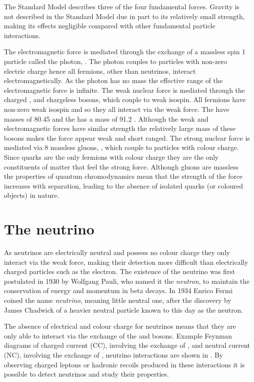 The Standard Model describes three of the four fundamental forces. Gravity is not described in the Standard Model due in part to its relatively small strength, making its effects negligible compared with other fundamental particle interactions.

The electromagnetic force is mediated through the exchange of a massless spin 1 particle called the photon, \Pphoton. The photon couples to particles with non-zero electric charge hence all fermions, other than neutrinos, interact electromagnetically. As the photon has no mass the effective range of the electromagnetic force is infinite. The weak nuclear force is mediated through the charged \PWplus, \PWminus and chargeless \PZzero bosons, which couple to weak isospin. All fermions have non-zero weak isospin and so they all interact via the weak force. The \PWpm have masses of 80.45 \GeV and the \PZzero has a mass of 91.2 \GeV. Although the weak and electromagnetic forces have similar strength the relatively large mass of these bosons makes the force appear weak and short ranged. The strong nuclear force is mediated via 8 massless gluons, \Pgluon, which couple to particles with colour charge. Since quarks are the only fermions with colour charge they are the only constituents of matter that feel the strong force. Although gluons are massless the properties of quantum chromodynamics mean that the strength of the force increases with separation, leading to the absence of isolated quarks (or coloured objects) in nature.



\section{The neutrino}
\label{section:particle-physics:neutrino}

As neutrinos are electrically neutral and possess no colour charge they only interact via the weak force, making their detection more difficult than electrically charged particles such as the electron. The existence of the neutrino was first postulated in 1930 by Wolfgang Pauli, who named it the \textit{neutron}, to maintain the conservation of energy and momentum in beta decays. In 1934 Enrico Fermi coined the name \textit{neutrino}, meaning little neutral one, after the discovery by James Chadwick of a heavier neutral particle known to this day as the neutron.

The absence of electrical and colour charge for neutrinos means that they are only able to interact via the exchange of the \PWpm and \PZzero bosons. Example Feynman diagrams of charged current (CC), involving the exchange of \PWpm, and neutral current (NC), involving the exchange of \PZzero, neutrino interactions are shown in . By observing charged leptons or hadronic recoils produced in these interactions it is possible to detect neutrinos and study their properties.

